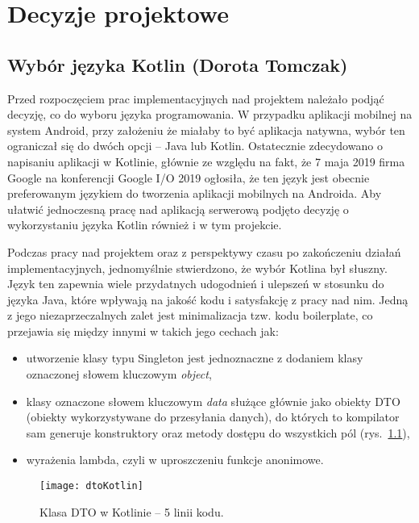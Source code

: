 \chapter{Decyzje projektowe}

\section{Wybór języka Kotlin (Dorota Tomczak)}
\par Przed rozpoczęciem prac implementacyjnych nad projektem należało podjąć decyzję, co do wyboru języka programowania. W przypadku aplikacji mobilnej na system Android, przy założeniu że miałaby to być aplikacja natywna, wybór ten ograniczał się do dwóch opcji – Java lub Kotlin. Ostatecznie zdecydowano o napisaniu aplikacji w Kotlinie, głównie ze względu na fakt, że 7 maja 2019 firma Google na konferencji Google I/O 2019 ogłosiła, że ten język jest obecnie preferowanym językiem do tworzenia aplikacji mobilnych na Androida\cite{Google I/O 2019}. Aby ułatwić jednoczesną pracę nad aplikacją serwerową podjęto decyzję o wykorzystaniu języka Kotlin również i w tym projekcie.
\par Podczas pracy nad projektem oraz z perspektywy czasu po zakończeniu działań implementacyjnych, jednomyślnie stwierdzono, że wybór Kotlina był słuszny. Język ten zapewnia wiele przydatnych udogodnień i ulepszeń w stosunku do języka Java, które wpływają na jakość kodu i satysfakcję z pracy nad nim. Jedną z jego niezaprzeczalnych zalet jest minimalizacja tzw. kodu boilerplate, co przejawia się między innymi w takich jego cechach jak: 

\begin{itemize}
\item utworzenie klasy typu Singleton jest jednoznaczne z dodaniem klasy oznaczonej słowem kluczowym \textit{object},
\item klasy oznaczone słowem kluczowym \textit{data} służące głównie jako obiekty DTO (obiekty wykorzystywane do przesyłania danych), do których to kompilator sam generuje konstruktory oraz metody dostępu do wszystkich pól (rys.~\ref{fig:dtoKotlin}),
\item wyrażenia lambda, czyli w uproszczeniu funkcje anonimowe.
\end{itemize}

\begin{figure}[h]
\centering
\texttt{[image: dtoKotlin]}
\caption{Klasa DTO w Kotlinie -- 5 linii kodu.}
\label{fig:dtoKotlin}
\end{figure}
\FloatBarrier

